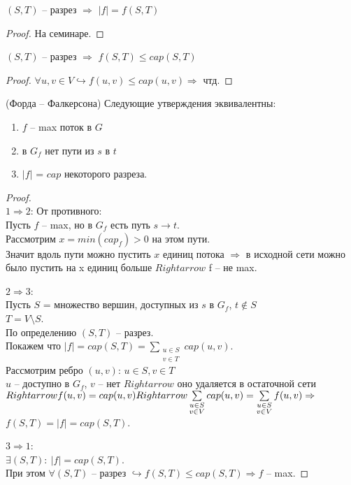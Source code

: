 \begin{lemma}
	$(S, T)$ -- разрез $\Rightarrow$ $\lvert f \rvert = f(S, T)$
\end{lemma}

\begin{proof}
	На семинаре.	
\end{proof}

\begin{lemma}
	$(S, T)$ -- разрез $\Rightarrow$ $f(S, T) \leq cap(S, T)$
\end{lemma}

\begin{proof}
	$\forall u, v \in V \hookrightarrow f(u, v) \leq cap(u, v) \Rightarrow$ чтд.
\end{proof}

\begin{theorem} (Форда -- Фалкерсона)
	Следующие утверждения эквивалентны:
	\begin{enumerate}
		\item $f$ -- max поток в $G$  
		\item в $G_f$ нет пути из  $s$ в  $t$
		\item $\lvert f \rvert$  = $cap$ некоторого разреза.
	\end{enumerate}
\end{theorem}

\begin{proof} \ \\
	$1 \Rightarrow 2$: От противного: \\
		Пусть  $f$ -- max, но в  $G_f$ есть путь  $s \rightarrow t$. \\
		Рассмотрим  $x = min(cap_f) > 0$ на этом пути. \\
		Значит вдоль пути можно пустить  $x$ единиц потока  $\Rightarrow$ в исходной сети можно было пустить на x единиц больше $Rightarrow$ f -- не  max. 

	$2 \Rightarrow 3$: \\
		Пусть $S$ = множество вершин, доступных из  $s$ в  $G_f$,  $t \notin S$ \\
		$T = V \setminus S$. \\
		По определению $(S, T)$ -- разрез. \\
		Покажем что $\lvert f \rvert = cap(S, T) = \sum\limits_{\substack{u \in S \\ v \in T}} cap(u, v)$. \\
		Рассмотрим ребро $(u, v)$: $u \in S, v \in T$ \\
		$u$ -- доступно в  $G_f$,  $v$ -- нет  $Rightarrow$ оно удаляется в остаточной сети $Rightarrow \\
		f(u, v) = cap(u, v) Rightarrow \sum\limits_{\substack{u \in S \\ v \in V}} cap(u, v) = \sum\limits_{\substack{u \in S \\ v \in V}} f(u, v) \Rightarrow$ \\
		$f(S, T) = \lvert f \rvert = cap(S, T)$. 

	$3 \Rightarrow 1$: \\
	$\exists (S, T):\ \lvert f \rvert = cap(S, T)$. \\
	При этом $\forall (S, T)$ -- разрез $\hookrightarrow f(S, T) \leq cap(S, T) \Rightarrow f$  -- max. 
\end{proof}

